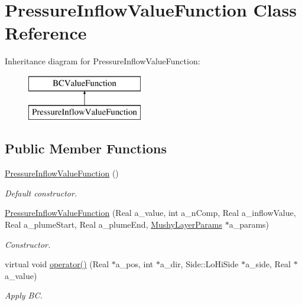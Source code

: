 \hypertarget{class_pressure_inflow_value_function}{\section{Pressure\-Inflow\-Value\-Function Class Reference}
\label{class_pressure_inflow_value_function}
}
Inheritance diagram for Pressure\-Inflow\-Value\-Function\-:\begin{figure}[H]
\begin{center}
\leavevmode
\includegraphics[height=2.000000cm]{class_pressure_inflow_value_function}
\end{center}
\end{figure}
\subsection*{Public Member Functions}
\begin{DoxyCompactItemize}
\item 
\hypertarget{class_pressure_inflow_value_function_aafa131789b607de20fefcca422d6795c}{\hyperlink{class_pressure_inflow_value_function_aafa131789b607de20fefcca422d6795c}{Pressure\-Inflow\-Value\-Function} ()}\label{class_pressure_inflow_value_function_aafa131789b607de20fefcca422d6795c}

\begin{DoxyCompactList}\small\item\em Default constructor. \end{DoxyCompactList}\item 
\hypertarget{class_pressure_inflow_value_function_a2907075ed6815d19bb140409dd79f5b5}{\hyperlink{class_pressure_inflow_value_function_a2907075ed6815d19bb140409dd79f5b5}{Pressure\-Inflow\-Value\-Function} (Real a\-\_\-value, int a\-\_\-n\-Comp, Real a\-\_\-inflow\-Value, Real a\-\_\-plume\-Start, Real a\-\_\-plume\-End, \hyperlink{class_mushy_layer_params}{Mushy\-Layer\-Params} $\ast$a\-\_\-params)}\label{class_pressure_inflow_value_function_a2907075ed6815d19bb140409dd79f5b5}

\begin{DoxyCompactList}\small\item\em Constructor. \end{DoxyCompactList}\item 
\hypertarget{class_pressure_inflow_value_function_ae700fea713b189f7b4ce066290f8b14e}{virtual void \hyperlink{class_pressure_inflow_value_function_ae700fea713b189f7b4ce066290f8b14e}{operator()} (Real $\ast$a\-\_\-pos, int $\ast$a\-\_\-dir, Side\-::\-Lo\-Hi\-Side $\ast$a\-\_\-side, Real $\ast$a\-\_\-value)}\label{class_pressure_inflow_value_function_ae700fea713b189f7b4ce066290f8b14e}

\begin{DoxyCompactList}\small\item\em Apply B\-C. \end{DoxyCompactList}\end{DoxyCompactItemize}
